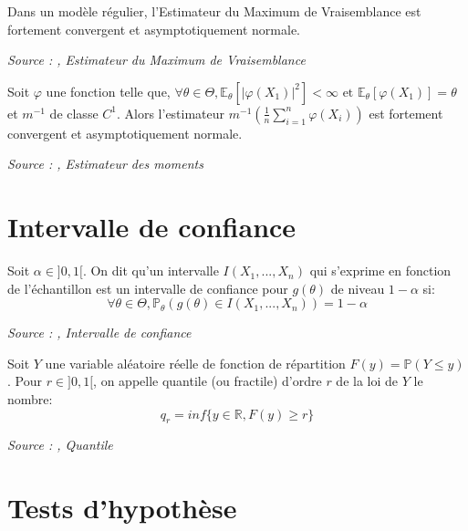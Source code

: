 \begin{definition}\label{def:propriete_emv}
Dans un modèle régulier, l'Estimateur du Maximum de Vraisemblance est fortement convergent et asymptotiquement normale.

\noindent\textit{Source : \cite{stat_ingenieur},  Estimateur du Maximum de Vraisemblance}
\end{definition}

\begin{definition}\label{def:propriete_estimateur_moments}
Soit $\varphi$ une fonction telle que, $\forall \theta \in \Theta, \mathbb{E}_\theta[|\varphi(X_1)|^2] < \infty \text{ et } \mathbb{E}_\theta[\varphi(X_1)] = \theta$ et $m^{-1}$ de classe $C^1$.
Alors l'estimateur $m^{-1}(\frac{1}{n}\sum_{i = 1}^n \varphi(X_i))$ est fortement convergent et asymptotiquement normale.

\noindent\textit{Source : \cite{stat_ingenieur},  Estimateur des moments}
\end{definition}

\section{Intervalle de confiance}

\begin{definition}\label{def:intervalle_confiance}
Soit $\alpha \in ]0, 1[$. On dit qu'un intervalle $I(X_1, ..., X_n)$ qui s'exprime en fonction de l'échantillon est un intervalle de confiance pour $g(\theta)$ de niveau $1 - \alpha$ si:
$$\forall \theta \in \Theta, \mathbb{P}_\theta(g(\theta) \in I(X_1, ..., X_n)) = 1 - \alpha$$

\noindent\textit{Source : \cite{stat_ingenieur},  Intervalle de confiance}
\end{definition}

\begin{definition}\label{def:quantile}
Soit $Y$ une variable aléatoire réelle de fonction de répartition $F(y) = \mathbb{P}(Y \le y)$. Pour $r \in ]0, 1[$, on appelle quantile (ou fractile) d'ordre $r$ de la loi de $Y$ le nombre:
$$q_r = inf\{y \in \mathbb{R}, F(y) \ge r\}$$

\noindent\textit{Source : \cite{stat_ingenieur},  Quantile}
\end{definition}


\section{Tests d'hypothèse}

